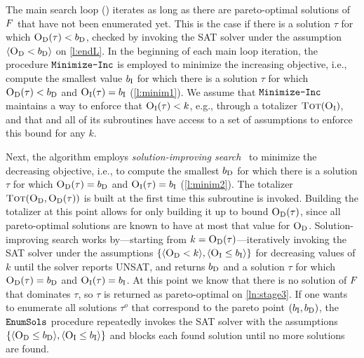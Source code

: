 The main search loop () iterates as long as there are pareto-optimal solutions of $F$ that have not been enumerated yet. 
This is the case if there is a solution $\tau$ for which $\textsc{O}_{\text{D}}(\tau) < b_{\text{D}}$, checked by invoking the SAT solver under the assumption $\langle \textsc{O}_{\text{D}} < b_{\text{D}} \rangle$ on \cref{l:endL}.
In the beginning of each main loop iteration, the procedure $\texttt{Minimize-\allowbreak{}Inc}$ is employed to minimize the increasing objective, i.e., compute the smallest value $b_{\text{I}}$ for which there is a solution $\tau$ for which $\textsc{O}_{\text{D}}(\tau) < b_{\text{D}}$ and $\textsc{O}_{\text{I}}(\tau) = b_{\text{I}}$  (\cref{l:minim1}). 
We assume that $\texttt{Minimize-\allowbreak{}Inc}$ maintains a way to enforce that $\textsc{O}_{\text{I}}(\tau) < k$, e.g., through a totalizer $\textsc{Tot}(\textsc{O}_{\text{I}})$, and that \algname{} and all of its subroutines have access to a set of assumptions to enforce this bound for any $k$.

Next, the algorithm employs \emph{solution-improving search}~\autocite{handbook2-maxsat,DBLP:journals/jsat/BerreP10,DBLP:journals/jsat/EenS06} to minimize the decreasing objective, i.e., to compute the smallest $b_{\text{D}}$ for which there is a solution $\tau$ for which $\textsc{O}_{\text{D}}(\tau) = b_{\text{D}}$ and $\textsc{O}_{\text{I}}(\tau) = b_{\text{I}}$  (\cref{l:minim2}).
The totalizer $\textsc{Tot}(\textsc{O}_{\text{D}}, \textsc{O}_{\text{D}}(\tau))$ is built at the first time this subroutine is invoked.
Building the totalizer at this point allows for only building it up to bound $\textsc{O}_{\text{D}}(\tau)$, since all pareto-optimal solutions are known to have at most that value for $\textsc{O}_{\text{D}}$.
Solution-improving search works by---starting from $k=\textsc{O}_{\text{D}}(\tau)$---iteratively invoking the SAT solver under the assumptions $\{\langle \textsc{O}_{\text{D}} < k \rangle, \langle \textsc{O}_{\text{I}} \leq b_{\text{I}} \rangle\}$ for decreasing values of $k$ until the solver reports UNSAT, and returns $b_{\text{D}}$ and a solution $\tau$ for which $\textsc{O}_{\text{D}}(\tau) = b_{\text{D}}$ and $\textsc{O}_{\text{I}}(\tau) = b_{\text{I}}$.
At this point we know that there is no solution of $F$ that dominates $\tau$, so $\tau$ is returned as pareto-optimal on \cref{ln:stage3}.
If one wants to enumerate all solutions $\tau^o$ that correspond to the pareto point $(b_{\text{I}},b_{\text{D}})$, the $\texttt{EnumSols}$ procedure repeatedly invokes the SAT solver with the assumptions $\{\langle \textsc{O}_{\text{D}} \leq b_{\text{D}} \rangle , \langle \textsc{O}_{\text{I}} \leq b_{\text{I}} \rangle\}$ and blocks each found solution until no more solutions are found.

